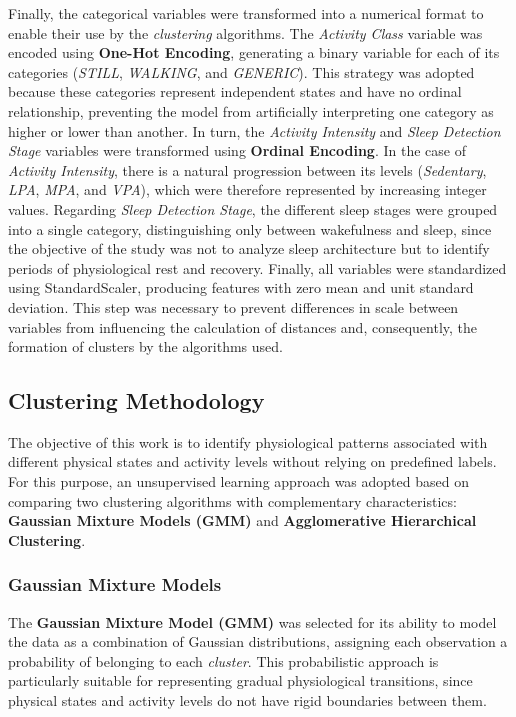 \documentclass[a4paper,fleqn]{cas-sc}
\newcommand{\newtext}[1]{{\color{magenta}#1}}
\begin{document}
Finally, the categorical variables were transformed into a numerical format to enable their use by the \textit{clustering} algorithms. The \textit{Activity Class} variable was encoded using \textbf{One-Hot Encoding}, generating a binary variable for each of its categories (\textit{STILL}, \textit{WALKING}, and \textit{GENERIC}). This strategy was adopted because these categories represent independent states and have no ordinal relationship, preventing the model from artificially interpreting one category as higher or lower than another. In turn, the \textit{Activity Intensity} and \textit{Sleep Detection Stage} variables were transformed using \textbf{Ordinal Encoding}. In the case of \textit{Activity Intensity}, there is a natural progression between its levels (\textit{Sedentary}, \textit{LPA}, \textit{MPA}, and \textit{VPA}), which were therefore represented by increasing integer values. Regarding \textit{Sleep Detection Stage}, the different sleep stages were grouped into a single category, distinguishing only between wakefulness and sleep, since the objective of the study was not to analyze sleep architecture but to identify periods of physiological rest and recovery. Finally, all variables were standardized using StandardScaler, producing features with zero mean and unit standard deviation. This step was necessary to prevent differences in scale between variables from influencing the calculation of distances and, consequently, the formation of clusters by the algorithms used.

\subsection{Clustering Methodology}

The objective of this work is to identify physiological patterns associated with different \newtext{physical states and activity levels} without relying on predefined labels. For this purpose, an unsupervised learning approach was adopted based on comparing two clustering algorithms with complementary characteristics: \textbf{Gaussian Mixture Models (GMM)} and \textbf{Agglomerative Hierarchical Clustering}.

\subsubsection{Gaussian Mixture Models}

The \textbf{Gaussian Mixture Model (GMM)} was selected for its ability to model the data as a combination of Gaussian distributions, assigning each observation a probability of belonging to each \textit{cluster}. This probabilistic approach is particularly suitable for representing gradual physiological transitions, since \newtext{physical states and activity levels} do not have rigid boundaries between them.
\end{document}
